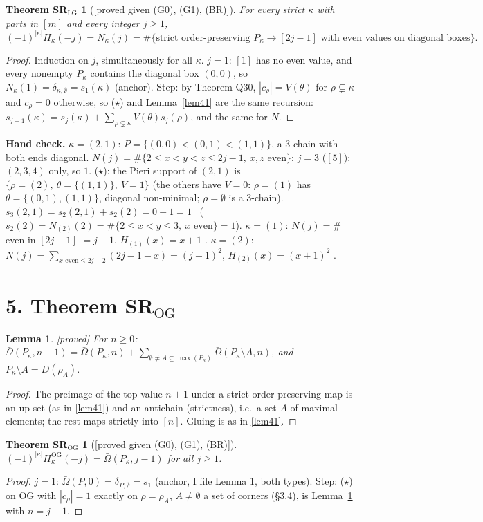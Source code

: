 \documentclass[10pt]{amsart}
\newcommand{\grade}[1]{\textsf{[#1]}}
\newcommand{\LG}{\mathrm{LG}}
\newcommand{\OG}{\mathrm{OG}}
\newcommand{\Ob}{\bar\Omega}
\newtheorem*{thmSRLG}{Theorem SR$_{\LG}$}
\newtheorem*{thmSROG}{Theorem SR$_{\OG}$}
\newtheorem{lem}{Lemma}[section]
\theoremstyle{remark}
\begin{document}
\begin{thmSRLG}[\grade{proved given (G0), (G1), (BR)}]
For every strict $\kappa$ with parts in $[m]$ and every integer $j\ge1$,
\[(-1)^{|\kappa|}H_\kappa(-j)=N_\kappa(j)=\#\{\text{strict order-preserving }P_\kappa\to[2j-1]\text{ with even values on
diagonal boxes}\}.\]
\end{thmSRLG}
\begin{proof}
Induction on $j$, simultaneously for all $\kappa$. $j=1$: $[1]$ has no even value, and every nonempty $P_\kappa$ contains
the diagonal box $(0,0)$, so $N_\kappa(1)=\delta_{\kappa,\emptyset}=s_1(\kappa)$ (anchor). Step: by Theorem Q30,
$|c_\rho|=V(\theta)$ for $\rho\subsetneq\kappa$ and $c_\rho=0$ otherwise, so ($\star$) and Lemma~\ref{lem41} are the same
recursion: $s_{j+1}(\kappa)=s_j(\kappa)+\sum_{\rho\subsetneq\kappa}V(\theta)s_j(\rho)$, and the same for $N$.
\end{proof}

\textbf{Hand check.} $\kappa=(2,1)$: $P=\{(0,0)<(0,1)<(1,1)\}$, a 3-chain with both ends diagonal. $N(j)=\#\{2\le x<y<z\le
2j-1,\ x,z\text{ even}\}$: $j=3$ ($[5]$): $(2,3,4)$ only, so $1$. ($\star$): the Pieri support of $(2,1)$ is
$\{\rho=(2),\ \theta=\{(1,1)\},\ V=1\}$ (the others have $V=0$: $\rho=(1)$ has $\theta=\{(0,1),(1,1)\}$, diagonal
non-minimal; $\rho=\emptyset$ is a 3-chain). $s_3(2,1)=s_2(2,1)+s_2(2)=0+1=1$ \checkmark\ ($s_2(2)=N_{(2)}(2)=\#\{2\le x<y\le3,\
x\text{ even}\}=1$). $\kappa=(1)$: $N(j)=\#$even in $[2j-1]$ $=j-1$, $H_{(1)}(x)=x+1$ \checkmark. $\kappa=(2)$:
$N(j)=\sum_{x\text{ even}\le2j-2}(2j-1-x)=(j-1)^2$, $H_{(2)}(x)=(x+1)^2$ \checkmark.

\section*{5. Theorem SR$_{\OG}$}

\begin{lem}\label{lem51}\grade{proved}
For $n\ge0$: $\Ob(P_\kappa,n+1)=\Ob(P_\kappa,n)+\sum_{\emptyset\ne A\subseteq\max(P_\kappa)}\Ob(P_\kappa\setminus A,n)$, and
$P_\kappa\setminus A=D(\rho_A)$.
\end{lem}
\begin{proof}
The preimage of the top value $n+1$ under a strict order-preserving map is an up-set (as in \ref{lem41}) and an antichain
(strictness), i.e.\ a set $A$ of maximal elements; the rest maps strictly into $[n]$. Gluing is as in \ref{lem41}.
\end{proof}

\begin{thmSROG}[\grade{proved given (G0), (G1), (BR)}]
$(-1)^{|\kappa|}H^{\OG}_\kappa(-j)=\Ob(P_\kappa,j-1)$ for all $j\ge1$.
\end{thmSROG}
\begin{proof}
$j=1$: $\Ob(P,0)=\delta_{P,\emptyset}=s_1$ (anchor, I file Lemma 1, both types). Step: ($\star$) on OG with $|c_\rho|=1$
exactly on $\rho=\rho_A$, $A\ne\emptyset$ a set of corners (\S3.4), is Lemma~\ref{lem51} with $n=j-1$.
\end{proof}
\end{document}
